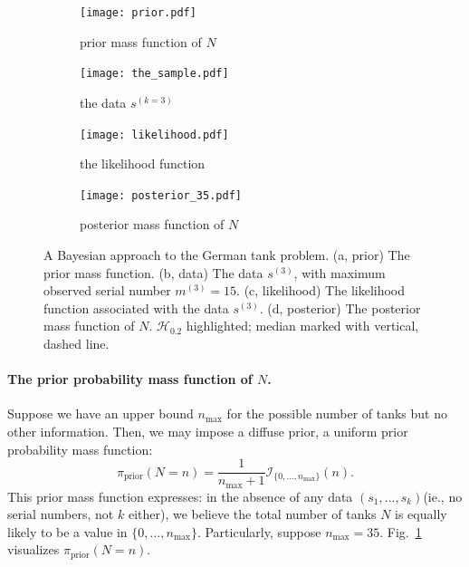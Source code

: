 \documentclass[11pt, oneside]{article}
\newcommand{\data}{$(s_1, ..., s_k)$\xspace}
\begin{document}
\begin{figure}[h!]
	\centering
	\begin{subfigure}[b]{0.395\textwidth}
		\texttt{[image: prior.pdf]} \caption{prior mass function of $N$} \label{fig:the_prior}
	\end{subfigure} 
	
	\begin{subfigure}[b]{0.5\textwidth}
		\texttt{[image: the\_sample.pdf]} 
	\caption{the data $s^{(k=3)}$} \label{fig:the_data}
	\end{subfigure}
	\begin{subfigure}[b]{0.395\textwidth}
		\texttt{[image: likelihood.pdf]} \caption{the likelihood function} 		
		\label{fig:the_likelihood}
	\end{subfigure}

	\begin{subfigure}[b]{0.395\textwidth}
		\texttt{[image: posterior\_35.pdf]} \caption{posterior mass function of $N$} \label{fig:the_posterior}
	\end{subfigure}
	\caption{A Bayesian approach to the German tank problem. 
	(a, prior) The prior mass function.
	(b, data) The data $s^{(3)}$, with maximum observed serial number $m^{(3)}=15$.
	(c, likelihood) The likelihood function associated with the data $s^{(3)}$.
	(d, posterior) The posterior mass function of $N$. $\mathcal{H}_{0.2}$ highlighted; median marked with vertical, dashed line.
	}
\end{figure}

\paragraph{The prior probability mass function of $N$.}
Suppose we have an upper bound $n_{\text{max}}$ for the possible number of tanks but no other information. Then, we may impose a diffuse prior, a uniform prior probability mass function:
\begin{equation}
	\pi_{\text{prior}}(N=n) = \dfrac{1}{n_{\max}+1} \mathcal{I}_{ \{0, ..., n_{\text{max}}\}}(n).	 \label{eq:prior}
\end{equation} 
This prior mass function expresses: in the absence of any data \data (ie., no serial numbers, not $k$ either), we believe the total number of tanks $N$ is equally likely to be a value in $\{0, ..., n_{\text{max}}\}$. Particularly, suppose $n_\text{max}=35$. Fig.~\ref{fig:the_prior} visualizes $\pi_{\text{prior}}(N=n)$.
\end{document}
